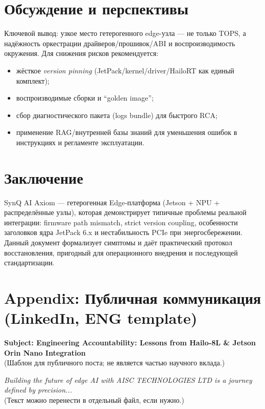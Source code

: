 \documentclass[11pt,a4paper]{article}
\begin{document}
\section{Обсуждение и перспективы}
Ключевой вывод: узкое место гетерогенного edge-узла — не только TOPS, а надёжность оркестрации драйверов/прошивок/ABI и воспроизводимость окружения. Для снижения рисков рекомендуется:
\begin{itemize}[leftmargin=1.2em]
  \item жёсткое \textit{version pinning} (JetPack/kernel/driver/HailoRT как единый комплект);
  \item воспроизводимые сборки и “golden image”;
  \item сбор диагностического пакета (logs bundle) для быстрого RCA;
  \item применение RAG/внутренней базы знаний для уменьшения ошибок в инструкциях и регламенте эксплуатации.
\end{itemize}

\section{Заключение}
SynQ AI Axiom — гетерогенная Edge‑платформа (Jetson + NPU + распределённые узлы), которая демонстрирует типичные проблемы реальной интеграции: firmware path mismatch, strict version coupling, особенности заголовков ядра JetPack 6.x и нестабильность PCIe при энергосбережении. Данный документ формализует симптомы и даёт практический протокол восстановления, пригодный для операционного внедрения и последующей стандартизации.

\appendix
\section{Appendix: Публичная коммуникация (LinkedIn, ENG template)}
\noindent \textbf{Subject: Engineering Accountability: Lessons from Hailo-8L \& Jetson Orin Nano Integration}\\
(Шаблон для публичного поста; не является частью научного вклада.)

\bigskip
\noindent \textit{Building the future of edge AI with AISC TECHNOLOGIES LTD is a journey defined by precision...}\\
(Текст можно перенести в отдельный файл, если нужно.)



\end{document}
